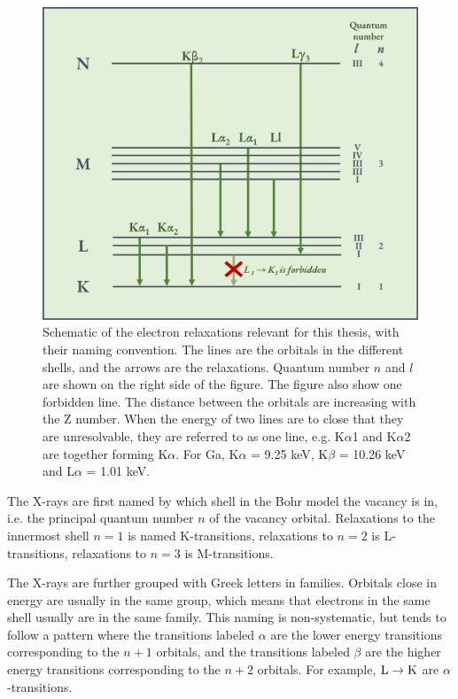 \begin{figure}[ht]
    \centering
    \includegraphics[width=0.7\linewidth]{figures/transition_lines.png}
    \caption{
        Schematic of the electron relaxations relevant for this thesis, with their naming convention.
        The lines are the orbitals in the different shells, and the arrows are the relaxations.
        Quantum number $n$ and $l$ are shown on the right side of the figure.
        The figure also show one forbidden line.
        The distance between the orbitals are increasing with the Z number.
        When the energy of two lines are to close that they are unresolvable, they are referred to as one line, e.g. K$\alpha$1 and K$\alpha$2 are together forming K$\alpha$.
        For Ga, K$\alpha$ = 9.25 keV, K$\beta$ = 10.26 keV and L$\alpha$ = 1.01 keV.
    }
    \label{fig:theory:theoreticalxray:naming:lines}
\end{figure}

The X-rays are first named by which shell in the Bohr model the vacancy is in, i.e. the principal quantum number $n$ of the vacancy orbital.
Relaxations to the innermost shell $n=1$ is named K-transitions, relaxations to $n=2$ is L-transitions, relaxations to $n=3$ is M-transitions.

The X-rays are further grouped with Greek letters in families. %
Orbitals close in energy are usually in the same group, which means that electrons in the same shell usually are in the same family.
This naming is non-systematic, but tends to follow a pattern where the transitions labeled $\alpha$ are the lower energy transitions corresponding to the $n+1$ orbitals, and the transitions labeled $\beta$ are the higher energy transitions corresponding to the $n+2$ orbitals.
For example, $\textnormal{L} \rightarrow \textnormal{K}$ are $\alpha$-transitions.

